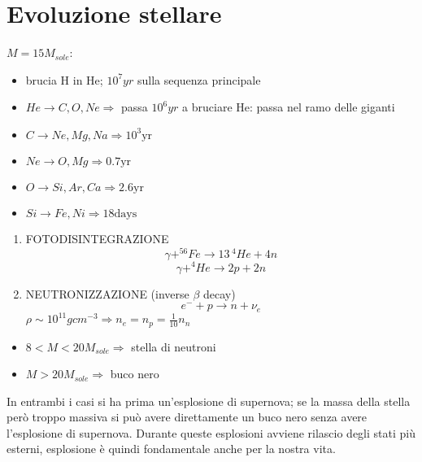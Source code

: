 \chapter{Evoluzione stellare}

$M = 15 M_{sole}$: 
\begin{itemize}
    \item brucia H in He;  $10^7 yr$ sulla sequenza principale
    \item $He \rightarrow C,O,Ne \Rightarrow$ passa $10^6 yr$ a bruciare He: passa nel ramo delle giganti
    \item $C \rightarrow Ne,Mg, Na \Rightarrow 10^3 \mbox{yr}$ 
    \item $Ne \rightarrow O,Mg \Rightarrow 0.7 \mbox{yr}$
    \item $O \rightarrow Si,Ar,Ca \Rightarrow 2.6 \mbox{yr}$
    \item $Si\rightarrow Fe, Ni \Rightarrow 18 \mbox{days}$
\end{itemize}
\begin{enumerate}
    \item FOTODISINTEGRAZIONE 
    \begin{equation*}
        \gamma + ^{56}Fe \rightarrow 13 \,  ^4He + 4n 
    \end{equation*}
    \begin{equation*}
        \gamma + ^4He \rightarrow 2p + 2n 
    \end{equation*}
    \item NEUTRONIZZAZIONE (inverse $\beta$ decay)
    \begin{equation*}
        e^- + p \rightarrow n + \nu_e
    \end{equation*}
    $\rho \sim 10^{11} gcm^{-3} \Rightarrow n_e=n_p = \frac{1}{10}n_n$ 
\end{enumerate}
\begin{itemize}
    \item $8 < M < 20M_{sole} \Rightarrow$ stella di neutroni
    \item $M > 20 M_{sole} \Rightarrow$ buco nero
\end{itemize}
In entrambi i casi si ha prima un'esplosione di supernova; se la massa della stella però troppo massiva si può avere direttamente un buco nero senza avere l'esplosione di supernova. Durante queste esplosioni avviene rilascio degli stati più esterni, esplosione è quindi fondamentale anche per la nostra vita.
